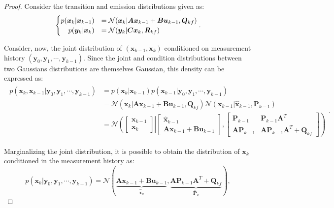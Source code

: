 \documentclass[a4paper,11pt]{book}
\numberwithin{figure}{chapter}
\numberwithin{equation}{chapter}
\numberwithin{table}{chapter}
\theoremstyle{definition}
\begin{document}
\begin{proof}
    Consider the transition and emission distributions given as:
    \begin{align}
    \begin{cases}
        p(\bm{x}_{k} | \bm{x}_{k-1}) &= \mathcal{N}(\bm{x}_k | \bm{A}\bm{x}_{k-1} + \bm{B}\bm{u}_{k-1}, \bm{Q}_{kf}) \\
        \hfill p(\bm{y}_{k} | \bm{x}_{k}) &= \mathcal{N}(\bm{y}_k | \bm{C}\bm{x}_{k}, \bm{R}_{kf})
    \end{cases}
    .\end{align}
    
    Consider, now, the joint distribution of $\left( \bm{x}_{k-1}, \bm{x}_k \right)$ conditioned on measurement history $\left( \bm{y}_0, \bm{y}_1, \cdots, \bm{y}_{k-1} \right)$. Since the joint and condition distributions between two Gaussians distributions are themselves Gaussian, this density can be expressed as:
    \begin{align}
    \begin{split}
        p(\bm{x}_k, \bm{x}_{k-1} | \bm{y}_0, \bm{y}_1, \cdots, \bm{y}_{k-1}) &= p(\bm{x}_k | \bm{x}_{k-1}) p(\bm{x}_{k-1} | \bm{y}_0, \bm{y}_1, \cdots, \bm{y}_{k-1}) \\
        &= \mathcal{N}(\bm{x}_k | \bm{A}\bm{x}_{k-1}+\bm{B}\bm{u}_{k-1}, \bm{Q}_{kf}) \mathcal{N}(\bm{x}_{k-1} | \hat{\bm{x}}_{k-1}, \bm{P}_{k-1}) \\
        &= \mathcal{N}\left( \begin{bmatrix} \bm{x}_{k-1} \\ \bm{x}_{k} \end{bmatrix}    \right| \left. \begin{bmatrix} \hat{\bm{x}}_{k-1} \\ \bm{A}\bm{x}_{k-1}+\bm{B}\bm{u}_{k-1} \end{bmatrix}, \begin{bmatrix} \bm{P}_{k-1} & \bm{P}_{k-1} \bm{A}^T  \\ \bm{A} \bm{P}_{k-1} & \bm{A} \bm{P}_{k-1} \bm{A}^T + \bm{Q}_{kf} \end{bmatrix}  \right)
    \end{split}
    .\end{align}
    
    Marginalizing the joint distribution, it is possible to obtain the distribution of $\bm{x}_k$ conditioned in the measurement history as:
    \begin{equation}
        p(\bm{x}_k | \bm{y}_0, \bm{y}_1, \cdots, \bm{y}_{k-1}) = \mathcal{N}( \underbrace{\bm{A} \bm{x}_{k-1} + \bm{B} \bm{u}_{k-1}}_{\hat{\bar{\bm{x}}}_k}, \underbrace{\bm{A} \bm{P}_{k-1} \bm{A}^T + \bm{Q}_{kf}}_{\bar{\bm{P}}_k} )
    ,\end{equation}
    

\end{proof}
\end{document}
